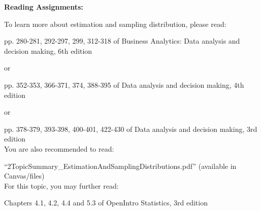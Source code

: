 \documentclass[11pt]{article}
\begin{document}
\begin{itemize}


\end{itemize}


\noindent\textbf{Reading Assignments:}



To learn more about estimation and sampling distribution, please read:

pp. 280-281, 292-297, 299, 312-318 of Business Analytics: Data analysis and decision making, 6th edition

or 

pp. 352-353, 366-371, 374, 388-395 of Data analysis and decision making, 4th edition

or 

pp. 378-379, 393-398, 400-401, 422-430 of  Data analysis and decision making, 3rd edition\\


You are also recommended to read:

``2TopicSummary\_EstimationAndSamplingDistributions.pdf'' (available in Canvas/files) \\


For this topic, you may further read:

Chapters 4.1, 4.2, 4.4 and 5.3 of OpenIntro Statistics, 3rd edition
\end{document}
